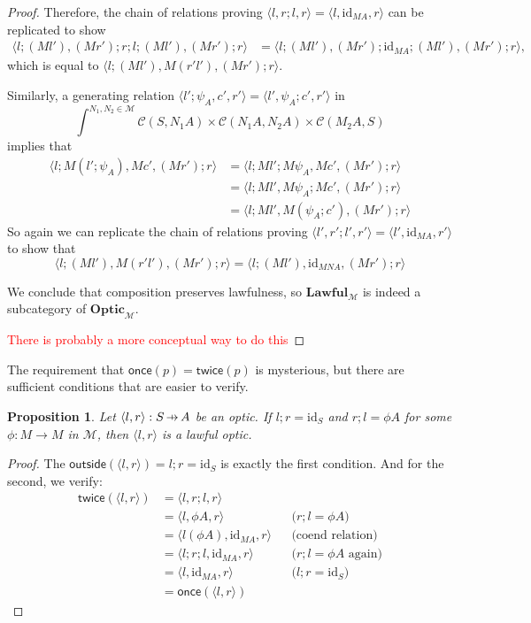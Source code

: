 \documentclass[11pt,a4paper]{article}
\theoremstyle{plain}
\newtheorem{proposition}[theorem]{Proposition}
\theoremstyle{definition}
\newcommand{\C}{\mathscr{C}}
\newcommand{\M}{\mathscr{M}}
\newcommand{\Optic}{\mathbf{Optic}}
\newcommand{\Lawful}{\mathbf{Lawful}}
\newcommand{\id}{\mathrm{id}}
\newcommand{\outside}{\mathsf{outside}}
\newcommand{\once}{\mathsf{once}}
\newcommand{\twice}{\mathsf{twice}}
\newcommand{\hto}{\ensuremath{\,\mathaccent\shortmid\rightarrow\,}}
\newcommand{\todo}[1]{\textcolor{red}{\small #1}}
\begin{document}
\begin{proof}
Therefore, the chain of relations proving $\langle l, r;l, r \rangle = \langle l, \id_{MA}, r \rangle$ can be replicated to show
\begin{align*}
\langle l;(Ml'), (Mr');r;l;(Ml') , (Mr') ; r \rangle &= \langle l;(Ml'), (Mr');\id_{MA};(Ml') , (Mr') ; r \rangle,
\end{align*}
which is equal to $\langle l;(Ml'), M(r'l'), (Mr') ; r \rangle$.

Similarly, a generating relation $\langle l';\psi_A, c', r' \rangle = \langle l', \psi_A ; c', r' \rangle$ in \[\int^{N_1, N_2 \in \M} \C(S, N_1 A) \times \C(N_1 A, N_2 A) \times \C(M_2 A, S)\]
implies that
\begin{align*}
\langle l;M(l';\psi_A), Mc', (Mr') ; r \rangle 
&= \langle l;Ml';M\psi_A, Mc', (Mr') ; r \rangle \\
&= \langle l;Ml', M\psi_A ; Mc', (Mr') ; r \rangle \\
&= \langle l;Ml', M(\psi_A;c'), (Mr') ; r \rangle 
\end{align*}
So again we can replicate the chain of relations proving $\langle l', r';l', r' \rangle = \langle l', \id_{MA}, r' \rangle$ to show that
\[\langle l;(Ml'), M(r'l'), (Mr') ; r \rangle = \langle l;(Ml'), \id_{MNA}, (Mr') ; r \rangle \]

We conclude that composition preserves lawfulness, so $\Lawful_\M$ is indeed a subcategory of $\Optic_\M$.

\todo{There is probably a more conceptual way to do this}
\end{proof}

The requirement that $\once(p) = \twice(p)$ is mysterious, but there are sufficient conditions that are easier to verify.

\begin{proposition}
Let $\langle l, r \rangle : S \hto A$ be an optic. If $l;r = \id_S$ and $r;l = \phi A$ for some $\phi : M \to M$ in $\M$, then $\langle l, r \rangle$ is a lawful optic.
\end{proposition}
\begin{proof}
The $\outside(\langle l, r \rangle) = l;r = \id_S$ is exactly the first condition. And for the second, we verify:
\begin{align*}
\twice(\langle l, r \rangle) 
&= \langle l, r;l, r \rangle \\
&= \langle l, \phi A, r \rangle && \text{($r;l = \phi A$)}\\
&= \langle l (\phi A), \id_{MA}, r \rangle && \text{(coend relation)} \\
&= \langle l;r;l, \id_{MA}, r \rangle && \text{($r;l = \phi A$ again)}\\
&= \langle l, \id_{MA}, r \rangle  && \text{($l;r = \id_S$)}\\
&= \once(\langle l, r \rangle) 
\end{align*}
\end{proof}
\end{document}
